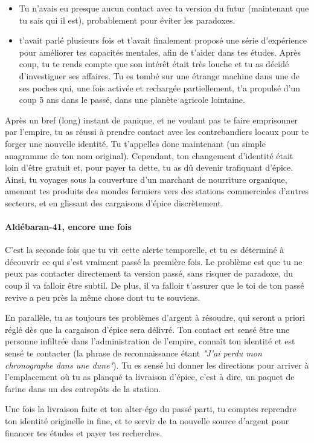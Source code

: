 {\begin{itemize}
		\item Tu n'avais eu presque aucun contact avec ta version du futur (maintenant que tu sais qui il est), probablement pour éviter les paradoxes.
		
		\item \nmPlayerI t'avait parlé plusieurs fois et t'avait finalement proposé une série d'expérience pour améliorer tes capacités mentales, afin de t'aider dans tes études. Après coup, tu te rends compte que son intérêt était très louche et tu as décidé d'investiguer ses affaires. Tu es tombé sur une étrange machine dans une de ses poches qui, une fois activée et rechargée partiellement, t'a propulsé d'un coup 5 ans dans le passé, dans une planète agricole lointaine.
	\end{itemize}
	
	\par Après un bref (long) instant de panique, et ne voulant pas te faire emprisonner par l'empire, tu as réussi à prendre contact avec les contrebandiers locaux pour te forger une nouvelle identité. Tu t'appelles donc maintenant \nmPlayerII (un simple anagramme de ton nom original). Cependant, ton changement d'identité était loin d'être gratuit et, pour payer ta dette, tu as dû devenir trafiquant d'épice. Ainsi, tu voyages sous la couverture d'un marchant de nourriture organique, amenant tes produits des mondes fermiers vers des stations commerciales d'autres secteurs, et en glissant des cargaisons d'épice discrètement.
	
	
	\paragraph{Aldébaran-41, encore une fois} C'est la seconde fois que tu vit cette alerte temporelle, et tu es déterminé à découvrir ce qui s'est vraiment passé la première fois. Le problème est que tu ne peux pas contacter directement ta version passé, sans risquer de paradoxe, du coup il va falloir être subtil. De plus, il va falloir t'assurer que le toi de ton passé revive a peu près la même chose dont tu te souviens.
	
	\par En parallèle, tu as toujours tes problèmes d'argent à résoudre, qui seront a priori réglé dès que la cargaison d'épice sera délivré. Ton contact est sensé être une personne infiltrée dans l'administration de l'empire, connaît ton identité et est sensé te contacter (la phrase de reconnaissance étant \emph{"J'ai perdu mon chronographe dans une dune"}). Tu es sensé lui donner les directions pour arriver à l'emplacement où tu as planqué ta livraison d'épice, c'est à dire, un paquet de farine dans un des entrepôts de la station.
	
	\par Une fois la livraison faite et ton alter-égo du passé parti, tu comptes reprendre ton identité originelle in fine, et te servir de ta nouvelle source d'argent pour financer tes études et payer tes recherches.
}




